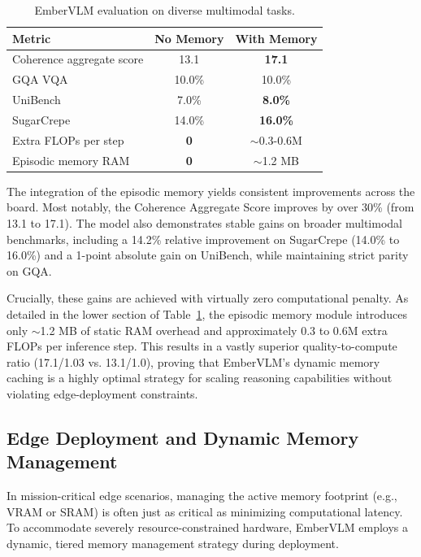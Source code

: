 \documentclass[runningheads]{llncs}
\begin{document}
\begin{table}[ht]
\centering
\caption{EmberVLM evaluation on diverse multimodal tasks.}
\label{tab:episodic_memory_gen_tasks}
\begin{tabular}{lcc}
\toprule
\textbf{Metric} & \textbf{No Memory} & \textbf{With Memory} \\
\midrule
Coherence aggregate score & 13.1 & \textbf{17.1} \\
GQA VQA \cite{hudson2019gqanewdatasetrealworld} & 10.0\% & 10.0\% \\
UniBench \cite{altahan2024unibenchvisualreasoningrequires} & 7.0\% & \textbf{8.0\%} \\
SugarCrepe \cite{hsieh2023sugarcrepefixinghackablebenchmarks}& 14.0\% & \textbf{16.0\%} \\
\midrule
Extra FLOPs per step & \textbf{0} & $\sim$0.3-0.6M \\
Episodic memory RAM & \textbf{0} & $\sim$1.2 MB \\
\bottomrule
\end{tabular}
\end{table}

The integration of the episodic memory yields consistent improvements across the board. Most notably, the Coherence Aggregate Score improves by over 30\% (from 13.1 to 17.1). The model also demonstrates stable gains on broader multimodal benchmarks, including a 14.2\% relative improvement on SugarCrepe (14.0\% to 16.0\%) and a 1-point absolute gain on UniBench, while maintaining strict parity on GQA.

Crucially, these gains are achieved with virtually zero computational penalty. As detailed in the lower section of Table~\ref{tab:episodic_memory_gen_tasks}, the episodic memory module introduces only $\sim$1.2 MB of static RAM overhead and approximately 0.3 to 0.6M extra FLOPs per inference step. This results in a vastly superior quality-to-compute ratio (17.1/1.03 vs. 13.1/1.0), proving that EmberVLM's dynamic memory caching is a highly optimal strategy for scaling reasoning capabilities without violating edge-deployment constraints.

\subsection{Edge Deployment and Dynamic Memory Management}
\label{sec:edge_deployment}

In mission-critical edge scenarios, managing the active memory footprint (e.g., VRAM or SRAM) is often just as critical as minimizing computational latency. To accommodate severely resource-constrained hardware, EmberVLM employs a dynamic, tiered memory management strategy during deployment. 
\end{document}
